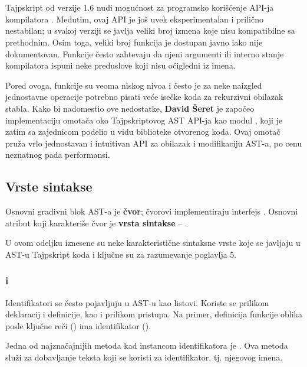 \section{}
\label{sec:ts-simple-ast}

Tajpskript od verzije 1.6 nudi mogućnost za programsko korišćenje API-ja kompilatora \cite{gh:ms:ts:wiki:using-the-compiler-api}.
Međutim, ovaj API je još uvek eksperimentalan i prilično nestabilan; u svakoj verziji se javlja veliki broj izmena koje nisu kompatibilne sa prethodnim.
Osim toga, veliki broj funkcija je dostupan javno iako nije dokumentovan.
Funkcije često zahtevaju da njeni argumenti ili interno stanje kompilatora ispuni neke preduslove koji nisu očigledni iz imena.

Pored ovoga, funkcije su veoma niskog nivoa i često je za neke naizgled jednostavne operacije potrebno pisati veće isečke koda za rekurzivni obilazak stabla.
Kako bi nadomestio ove nedostatke, \textbf{David Šeret} je započeo implementaciju omotača oko Tajpskriptovog AST API-ja kao modul , koji je zatim sa zajednicom podelio u vidu biblioteke otvorenog koda.
Ovaj omotač pruža vrlo jednostavan i intuitivan API za obilazak i modifikaciju AST-a, po cenu neznatnog pada performansi.

\subsection{Vrste sintakse}

Osnovni gradivni blok AST-a je \textbf{čvor}; čvorovi implementiraju interfejs .
Osnovni atribut koji karakteriše čvor je \textbf{vrsta sintakse} -- .

U ovom odeljku iznesene su neke karakteristične sintaksne vrste koje se javljaju u AST-u Tajpskript koda i ključne su za razumevanje poglavlja 5.

\subsubsection{ i }
\label{ast:Identifier}
\label{ast:ThisKeyword}

Identifikatori se često pojavljuju u AST-u kao listovi.
Koriste se prilikom deklaracij i definicije, kao i prilikom pristupa.
Na primer, definicija funkcije oblika  posle ključne reči  () ima identifikator ().

Jedna od najznačajnijih metoda kad instancom identifikatora je .
Ova metoda služi za dobavljanje teksta koji se koristi za identifikator, tj. njegovog imena.

